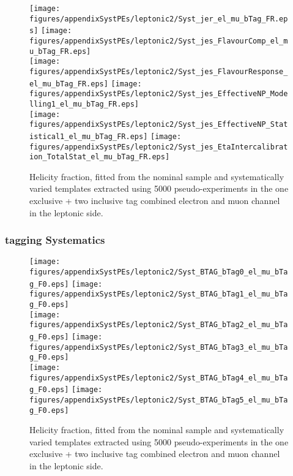\begin{figure}[!hb]
\begin{center}
        \texttt{[image: figures/appendixSystPEs/leptonic2/Syst\_jer\_el\_mu\_bTag\_FR.eps]}
        \texttt{[image: figures/appendixSystPEs/leptonic2/Syst\_jes\_FlavourComp\_el\_mu\_bTag\_FR.eps]}\\
        \texttt{[image: figures/appendixSystPEs/leptonic2/Syst\_jes\_FlavourResponse\_el\_mu\_bTag\_FR.eps]}
        \texttt{[image: figures/appendixSystPEs/leptonic2/Syst\_jes\_EffectiveNP\_Modelling1\_el\_mu\_bTag\_FR.eps]}\\
        \texttt{[image: figures/appendixSystPEs/leptonic2/Syst\_jes\_EffectiveNP\_Statistical1\_el\_mu\_bTag\_FR.eps]}
        \texttt{[image: figures/appendixSystPEs/leptonic2/Syst\_jes\_EtaIntercalibration\_TotalStat\_el\_mu\_bTag\_FR.eps]}

\caption{Helicity fraction, \fr fitted from the nominal \ttbar sample and systematically varied templates extracted using 5000 pseudo-experiments in the one exclusive + two inclusive \bt tag combined electron and muon channel in the leptonic side. }
\label{fig:systematicVar_lep_fR_elmu2incl_JERJES_1}
\end{center}
\end{figure}


\clearpage
\subsubsection{\bt tagging Systematics}

\begin{figure}[!hb]
\begin{center}
        \texttt{[image: figures/appendixSystPEs/leptonic2/Syst\_BTAG\_bTag0\_el\_mu\_bTag\_F0.eps]}
        \texttt{[image: figures/appendixSystPEs/leptonic2/Syst\_BTAG\_bTag1\_el\_mu\_bTag\_F0.eps]}\\
        \texttt{[image: figures/appendixSystPEs/leptonic2/Syst\_BTAG\_bTag2\_el\_mu\_bTag\_F0.eps]}
        \texttt{[image: figures/appendixSystPEs/leptonic2/Syst\_BTAG\_bTag3\_el\_mu\_bTag\_F0.eps]}\\
        \texttt{[image: figures/appendixSystPEs/leptonic2/Syst\_BTAG\_bTag4\_el\_mu\_bTag\_F0.eps]}
        \texttt{[image: figures/appendixSystPEs/leptonic2/Syst\_BTAG\_bTag5\_el\_mu\_bTag\_F0.eps]}
        
\caption{Helicity fraction, \fo fitted from the nominal \ttbar sample and systematically varied templates extracted using 5000 pseudo-experiments in the one exclusive + two inclusive \bt tag combined electron and muon channel in the leptonic side. }
\label{fig:systematicVar_lep_f0_elmu2incl_btag1}
\end{center}
\end{figure}

